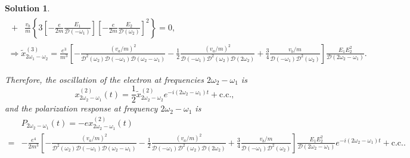 \documentclass[UTF8,10pt,a4paper]{article}
\theoremstyle{Problem}
\theoremstyle{Solution}
\newtheorem*{sol}{Solution}
\begin{document}
\begin{sol}
\begin{gather}
\begin{align}
            +          & \frac{v_b}{m}\left\{3\left[-\frac{e}{2m}\frac{E_1}{\mathcal{D}(-\omega_1)}\right]\left[-\frac{e}{2m}\frac{E_2}{\mathcal{D}(\omega_2)}\right]^2\right\}=0,
        \end{align}\\
        \Longrightarrow\tilde{x}_{2\omega_1-\omega_2}^{(3)}=\frac{e^3}{m^3}\left[-\frac{(v_a/m)^2}{\mathcal{D}^2(\omega_2)\mathcal{D}(-\omega_1)\mathcal{D}(\omega_2-\omega_1)}-\frac{1}{2}\frac{(v_a/m)^2}{\mathcal{D}(-\omega_1)\mathcal{D}^2(\omega_2)\mathcal{D}(2\omega_2)}+\frac{3}{4}\frac{v_b/m}{\mathcal{D}(-\omega_1)\mathcal{D}^2(\omega_2)}\right]\frac{E_1E_2^2}{\mathcal{D}(2\omega_2-\omega_1)}.
    \end{gather}

    Therefore, the oscillation of the electron at frequencies $2\omega_2-\omega_1$ is
    \begin{equation}
        x_{2\omega_2-\omega_1}^{(2)}(t)=\frac{1}{2}\tilde{x}_{2\omega_2-\omega_2}^{(2)}e^{-i(2\omega_2-\omega_1)t}+\text{c.c.},
    \end{equation}
    and the polarization response at frequency $2\omega_2-\omega_1$ is
    \begin{align}
        \nonumber & P_{2\omega_2-\omega_1}(t)=-ex_{2\omega_2-\omega_1}^{(2)}(t)                                                                                                                                                                                                                                                                                                                                  \\
        =         & -\frac{e^4}{2m^3}\left[-\frac{(v_a/m)^2}{\mathcal{D}^2(\omega_2)\mathcal{D}(-\omega_1)\mathcal{D}(\omega_2-\omega_1)}-\frac{1}{2}\frac{(v_a/m)^2}{\mathcal{D}(-\omega_1)\mathcal{D}^2(\omega_2)\mathcal{D}(2\omega_2)}+\frac{3}{4}\frac{v_b/m}{\mathcal{D}(-\omega_1)\mathcal{D}^2(\omega_2)}\right]\frac{E_1E_2^2}{\mathcal{D}(2\omega_2-\omega_1)}e^{-i(2\omega_2-\omega_1)t}+\text{c.c.}.
    \end{align}
\end{sol}
\end{document}
